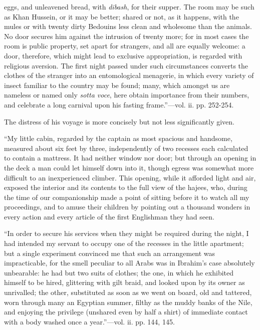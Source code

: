 eggs, and unleavened bread, with \emph{dibash}, for their supper. The
room may be such as Khan Hussein, or it may be better; shared or not, as
it happens, with the mules or with twenty dirty Bedouins less clean and
wholesome than the animals. No door secures him against the intrusion of
twenty more; for in most cases the room is public property, set apart
for strangers, and all are equally welcome: a door, therefore, which
might lead to exclusive appropriation, is regarded with religious
aversion. The first night passed under such circumstances converts the
clothes of the stranger into an entomological menagerie, in which every
variety of insect familiar to the country may be found; many, which
amongst us are nameless or named only \emph{sotta voce}, here obtain
importance from their numbers, and celebrate a long carnival upon his
fasting frame.''—vol. ii. pp. 252-254.

The
distress of his voyage is more concisely but not less significantly
given.

``My
little cabin, regarded by the captain as most spacious and handsome,
measured about six feet by three, independently of two recesses each
calculated to contain a mattress. It had neither window nor door; but
through an opening in the deck a man could let himself down into it,
though egress was somewhat more difficult to an inexperienced climber.
This opening, while it afforded light and air, exposed the interior and
its contents to the full view of the hajees, who, during the time of our
companionship made a point of sitting before it to watch all my
proceedings, and to amuse their children by pointing out a thousand
wonders in every action and every article of the first Englishman they
had seen.

``In
order to secure his services when they might be required during the
night, I had intended my servant to occupy one of the recesses in the
little apartment; but a single experiment convinced me that such an
arrangement was impracticable, for the smell peculiar to all Arabs was
in Ibrahim's case absolutely unbearable: he had but two suits of
clothes; the one, in which he exhibited himself to be hired, glittering
with gilt braid, and looked upon by its owner as unrivalled; the other,
substituted as soon as we went on board, old and tattered, worn through
many an Egyptian summer, filthy as the muddy banks of the Nile, and
enjoying the privilege (unshared even by half a shirt) of immediate
contact with a body washed once a year.''—vol. ii. pp. 144, 145.

